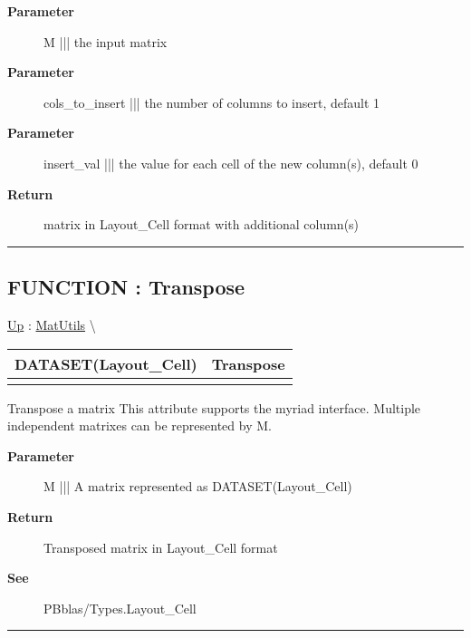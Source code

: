 \par
\begin{description}
\item [\textbf{Parameter}] M ||| the input matrix
\item [\textbf{Parameter}] cols\_to\_insert ||| the number of columns to insert, default 1
\item [\textbf{Parameter}] insert\_val ||| the value for each cell of the new column(s), default 0
\item [\textbf{Return}] matrix in Layout\_Cell format with additional column(s)
\end{description}

\rule{\linewidth}{0.5pt}
\subsection*{FUNCTION : Transpose}
\hypertarget{ecldoc:pbblas.matutils.transpose}{}
\hyperlink{ecldoc:PBblas.MatUtils}{Up} :
\hspace{0pt} \hyperlink{ecldoc:PBblas.MatUtils}{MatUtils} \textbackslash 

{\renewcommand{\arraystretch}{1.5}
\begin{tabularx}{\textwidth}{|>{\raggedright\arraybackslash}l|X|}
\hline
\hspace{0pt}DATASET(Layout\_Cell) & Transpose \\
\hline
\multicolumn{2}{|>{\raggedright\arraybackslash}X|}{\hspace{0pt}(DATASET(Layout\_Cell) M)} \\
\hline
\end{tabularx}
}

\par
Transpose a matrix This attribute supports the myriad interface. Multiple independent matrixes can be represented by M.

\par
\begin{description}
\item [\textbf{Parameter}] M ||| A matrix represented as DATASET(Layout\_Cell)
\item [\textbf{Return}] Transposed matrix in Layout\_Cell format
\item [\textbf{See}] PBblas/Types.Layout\_Cell
\end{description}

\rule{\linewidth}{0.5pt}


